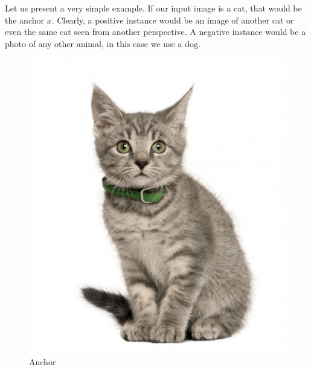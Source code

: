 \begin{nexample}
    Let us present a very simple example. If our input image is a cat, that would be the anchor $x$. Clearly, a positive instance would be an image of another cat or even the same cat seen from another perspective. A negative instance would be a photo of any other animal, in this case we use a dog.
    \begin{figure}[H]%
          \includegraphics[width=\linewidth]{media/c1}
          \caption*{Anchor}\label{fig:cat1}
        \endminipage\hfill

\end{figure}
\end{nexample}
